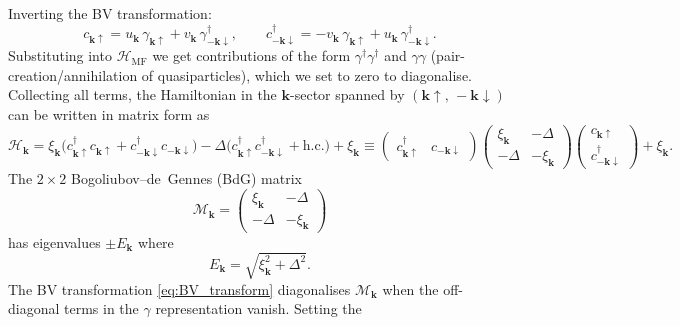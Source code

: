 Inverting the BV transformation:
\begin{equation}
	c_{\mathbf{k}\uparrow} = u_{\mathbf{k}}\, \gamma_{\mathbf{k}\uparrow}
	+ v_{\mathbf{k}}\, \gamma^\dagger_{-\mathbf{k}\downarrow}, \qquad
	c^\dagger_{-\mathbf{k}\downarrow} = -v_{\mathbf{k}}\, \gamma_{\mathbf{k}\uparrow}
	+ u_{\mathbf{k}}\, \gamma^\dagger_{-\mathbf{k}\downarrow}.
\end{equation}
Substituting into $\mathcal{H}_{\mathrm{MF}}$ we get contributions of the form
$\gamma^\dagger\gamma^\dagger$ and $\gamma\gamma$ (pair-creation/annihilation of
quasiparticles), which we set to zero to diagonalise. Collecting all terms, the
Hamiltonian in the $\mathbf{k}$-sector spanned by
$(\mathbf{k}\uparrow,\,-\mathbf{k}\downarrow)$ can be written in matrix form
as
\begin{equation}
	\mathcal{H}_{\mathbf{k}} = \xi_{\mathbf{k}}
	\bigl(c^\dagger_{\mathbf{k}\uparrow} c_{\mathbf{k}\uparrow}
	+ c^\dagger_{-\mathbf{k}\downarrow} c_{-\mathbf{k}\downarrow}\bigr)
	- \Delta\bigl(c^\dagger_{\mathbf{k}\uparrow} c^\dagger_{-\mathbf{k}\downarrow}
	+ \mathrm{h.c.}\bigr)
	+ \xi_{\mathbf{k}}
	\equiv
	\begin{pmatrix} c^\dagger_{\mathbf{k}\uparrow} & c_{-\mathbf{k}\downarrow} \end{pmatrix}
	\begin{pmatrix} \xi_{\mathbf{k}} & -\Delta \\ -\Delta & -\xi_{\mathbf{k}} \end{pmatrix}
	\begin{pmatrix} c_{\mathbf{k}\uparrow} \\ c^\dagger_{-\mathbf{k}\downarrow} \end{pmatrix}
	+ \xi_{\mathbf{k}}.
\end{equation}
The $2\times 2$ Bogoliubov--de~Gennes (BdG) matrix
\begin{equation}
	\mathcal{M}_{\mathbf{k}} = \begin{pmatrix} \xi_{\mathbf{k}} & -\Delta \\ -\Delta & -\xi_{\mathbf{k}} \end{pmatrix}
\end{equation}
has eigenvalues $\pm E_{\mathbf{k}}$ where
\begin{equation}
	\boxed{E_{\mathbf{k}} = \sqrt{\xi_{\mathbf{k}}^2 + \Delta^2}.}
	\label{eq:qp_spectrum}
\end{equation}
The BV transformation \eqref{eq:BV_transform} diagonalises $\mathcal{M}_{\mathbf{k}}$
when the off-diagonal terms in the $\gamma$ representation vanish. Setting the
